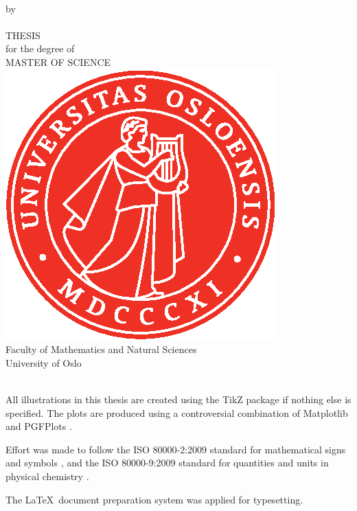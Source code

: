 \thispagestyle{empty}
\begin{center} \vspace{1cm}
    \textbf{\Large{\mtitle}}\\ \vspace{0.5cm}
    \small{by}\\ \vspace{0.5cm}
    \large{\mauthor}\\ \vspace{4.4cm}
    \large{THESIS}\\ \vspace{0.3cm}
    \small{for the degree of}\\ \vspace{0.3cm}
    \large{MASTER OF SCIENCE}\\ \vspace{0.7cm}
    \includegraphics[scale=1.0]{Images/UiO_Segl_pms485.eps} \\ \vspace{0.5cm}
    \large{Faculty of Mathematics and Natural Sciences \\ University of Oslo} \\ \vspace{0.5cm}
    \small{\mdate}\\ \vfill
\end{center}
\newpage
\vspace*{\fill}
{\setlength{\parindent}{0cm}
All illustrations in this thesis are created using the TikZ package \cite{tantau_graph_2013} if nothing else is specified. The plots are produced using a controversial combination of Matplotlib \cite{hunter_matplotlib:_2007} and PGFPlots \cite{tantau_graph_2013}.\bigskip

Effort was made to follow the ISO 80000-2:2009 standard for mathematical signs and symbols \cite{iso/tc_12_iso_nodate}, and the ISO 80000-9:2009 standard for quantities and units in physical chemistry \cite{iso/tc_12_iso_nodate-1}.\bigskip

The \LaTeX\, document preparation system was applied for typesetting.
} 
\newpage
